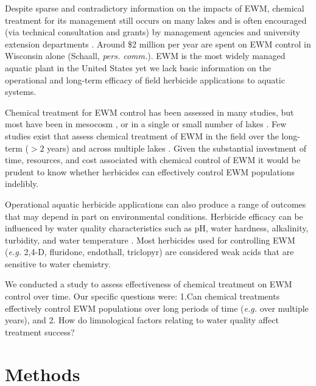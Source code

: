 \documentclass{article}
\begin{document}
Despite sparse and contradictory information on the impacts of EWM, chemical treatment for its management still occurs on many lakes and is often encouraged (via technical consultation and grants) by management agencies and university extension departments \citep{Parkinson2011, WSUecology}. Around \$2 million per year are spent on EWM control in Wisconsin alone (Schaall, \emph{pers. comm.}). EWM is the most widely managed aquatic plant in the United States \citep{Bartodziej1997} yet we lack basic information on the operational and long-term efficacy of field herbicide applications to aquatic systems.

Chemical treatment for EWM control has been assessed in many studies, but most have been in mesocosm \citep{Netherland1993, Netherland1992, Green1990}, or in a single or small number of lakes \citep[1-4,][]{Wersal2010, Poovey2004, Parsons2001, Getsinger1997, Getsinger1992, Lillie1986, Getsinger1982}. Few studies exist that assess chemical treatment of EWM in the field over the long-term ($>2$ years) and across multiple lakes \citep[but see][]{Nault2014, Smithetal2012}. Given the substantial investment of time, resources, and cost associated with chemical control of EWM it would be prudent to know whether herbicides can effectively control EWM populations indelibly. 

Operational aquatic herbicide applications can also produce a range of outcomes that may depend in part on environmental conditions. Herbicide efficacy can be influenced by water quality characteristics such as pH, water hardness, alkalinity, turbidity, and water temperature \citep{Roskamp2013, Chahal2012, Nalewaja1991, Orgell1957}. Most herbicides used for controlling EWM (\emph{e.g.} 2,4-D, fluridone, endothall, triclopyr) are considered weak acids that are sensitive to water chemistry.

We conducted a study to assess effectiveness of chemical treatment on EWM control over time. Our specific questions were: 1.Can chemical treatments effectively control EWM populations over long periods of time (\emph{e.g.} over multiple years), and 2. How do limnological factors relating to water quality affect treatment success? 

\vspace{8mm}

\section*{Methods}
\end{document}
